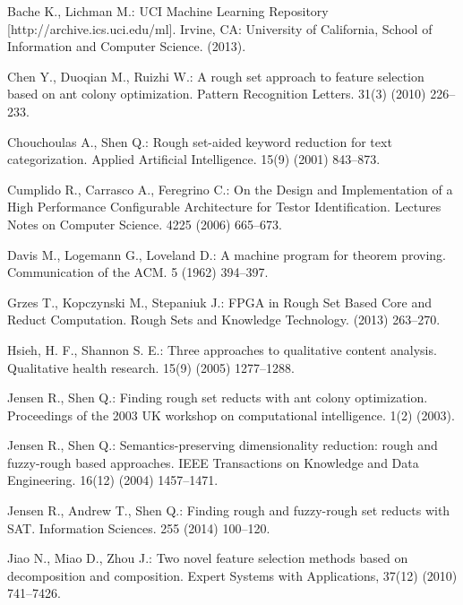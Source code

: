 \documentclass[11pt]{article}   %
\begin{document}
\begin{thebibliography}{}

	Bache K., Lichman M.:  
	UCI Machine Learning Repository [http://archive.ics.uci.edu/ml]. 
	Irvine, CA: University of California, School of Information and Computer Science. (2013).
	
	Chen Y., Duoqian M., Ruizhi W.:
	A rough set approach to feature selection based on ant colony optimization.
	Pattern Recognition Letters. 31(3) (2010) 226--233.

	Chouchoulas A., Shen Q.:
	Rough set-aided keyword reduction for text categorization.
	Applied Artificial Intelligence. 15(9) (2001) 843--873.
	
	Cumplido R., Carrasco A., Feregrino C.:
	On the Design and Implementation of a High Performance Configurable Architecture for Testor Identification.
	Lectures Notes on Computer Science. 4225 (2006) 665--673.
	
	Davis M., Logemann G., Loveland D.:
	A machine program for theorem proving.
	Communication of the ACM. 5 (1962) 394--397.

	Grzes T., Kopczynski M., Stepaniuk J.:
	FPGA in Rough Set Based Core and Reduct Computation. 
	Rough Sets and Knowledge Technology.	(2013) 263--270.

	Hsieh, H. F., Shannon S. E.:
	Three approaches to qualitative content analysis.
	Qualitative health research. 15(9) (2005) 1277--1288.
	
	Jensen R., Shen Q.:
	Finding rough set reducts with ant colony optimization.
	Proceedings of the 2003 UK workshop on computational intelligence. 1(2) (2003).

	Jensen R., Shen Q.:
	Semantics-preserving dimensionality reduction: rough and fuzzy-rough based approaches.
	IEEE Transactions on Knowledge and Data Engineering. 16(12) (2004) 1457--1471.
	
	Jensen R., Andrew T., Shen Q.:
	Finding rough and fuzzy-rough set reducts with SAT.
	Information Sciences. 255 (2014) 100--120.
	
	Jiao N., Miao D., Zhou J.:
 	Two novel feature selection methods based on decomposition and composition.
 	Expert Systems with Applications, 37(12) (2010) 741--7426.
 	

\end{thebibliography}
\end{document}
